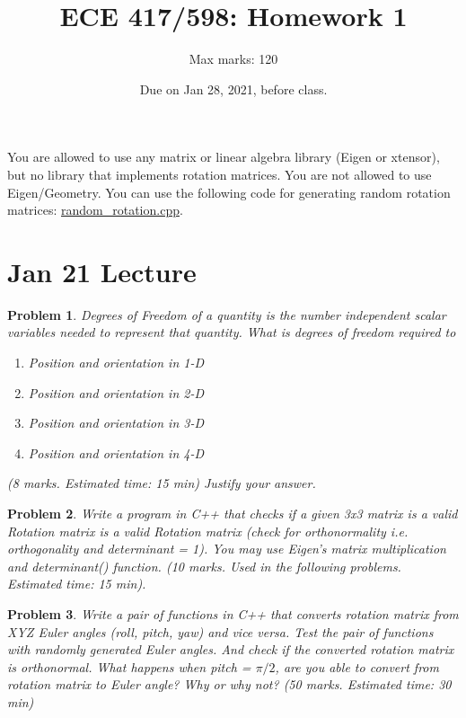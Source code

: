\documentclass[twocolumn]{article}
\title{ECE 417/598: Homework 1}
\author{Max marks: 120}
\date{Due on Jan 28, 2021, before class.}
\newtheorem{prob}{Problem}
\begin{document}
\maketitle

You are allowed to use any matrix or linear algebra library (Eigen or xtensor), but no
library that implements rotation matrices. You are not allowed to use
Eigen/Geometry. You can use the following code for generating random rotation matrices:
\href{https://github.com/wecacuee/ECE417-Mobile-Robots/blob/master/notebooks/random_rotation.cpp}{random\_rotation.cpp}.

\section{Jan 21 Lecture}
\begin{prob}
  Degrees of Freedom of a quantity is the number independent scalar variables
  needed to represent that quantity. What is degrees of freedom required to 
  \begin{enumerate}
    \item Position and orientation in 1-D
    \item Position and orientation in 2-D
    \item Position and orientation in 3-D
    \item Position and orientation in 4-D
  \end{enumerate} (8 marks. Estimated time: 15 min)
  Justify your answer.
\end{prob}

\begin{prob}
  Write a program in C++ that checks if a given
  3x3 matrix is a valid Rotation matrix is a valid Rotation matrix  (check for
  orthonormality i.e. orthogonality and determinant = 1). You may use Eigen's
  matrix multiplication and determinant() function. (10 marks. Used in the
  following problems. Estimated time: 15 min). 
\end{prob}

\begin{prob}
  Write a pair of functions in C++ that converts rotation matrix from XYZ Euler
angles (roll, pitch, yaw) and vice versa. Test the pair of functions with
randomly generated Euler angles. And check if the converted rotation matrix is
orthonormal. What happens when pitch = $\pi/2$, are you able to convert from
rotation matrix to Euler angle? Why or why not? (50 marks. Estimated time: 30 min)
\end{prob}
\end{document}
